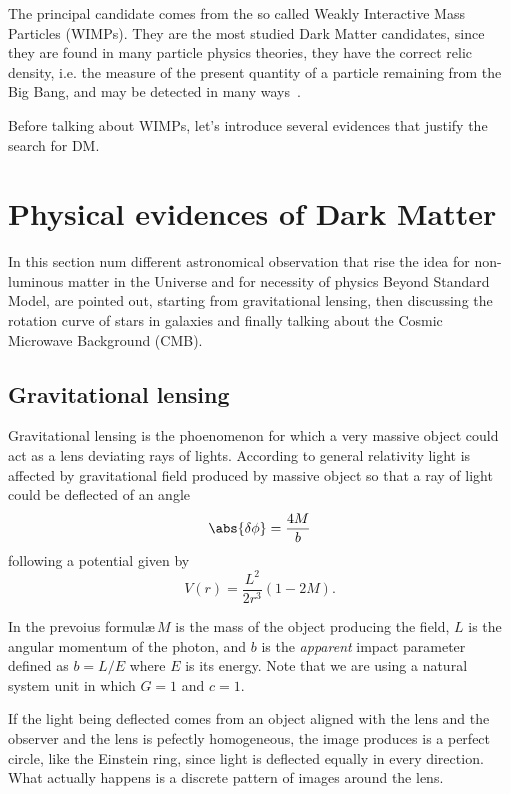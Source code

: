 The principal candidate comes from the so called Weakly Interactive Mass Particles (WIMPs). They are the most studied Dark Matter candidates, since they are found in many particle physics theories, they have the correct relic density, i.e. the measure of the present quantity of a particle remaining from the Big Bang, and may be detected in many ways~\cite{feng:DM}.

Before talking about WIMPs, let's introduce several evidences that justify the search for DM.

\section{Physical evidences of Dark Matter}
In this section num different astronomical observation that rise the idea for non-luminous matter in the Universe and for necessity of physics Beyond Standard Model, are pointed out, starting from gravitational lensing, then discussing the rotation curve of stars in galaxies and finally talking about the Cosmic Microwave Background (CMB).

\subsection{Gravitational lensing}
Gravitational lensing is the phoenomenon for which a very massive object could act as a lens deviating rays of lights. According to general relativity light is affected by gravitational field produced by massive object so that a ray of light could be deflected of an angle 
\begin{equation}
\abs{\delta\phi}=\frac{4M}{b}
\end{equation}
following a potential given by
\begin{equation}
V(r)=\frac{L^2}{2r^3}(1-2M).
\end{equation}

In the prevoius formul\ae $\,M$ is the mass of the object producing the field, $L$ is the angular momentum of the photon, and $b$ is the \emph{apparent} impact parameter defined as $b=L/E$ where $E$ is its energy. Note that we are using a natural system unit in which $G=1$ and $c=1$.

If the light being deflected comes from an object aligned with the lens and the observer and the lens is pefectly homogeneous, the image produces is a perfect circle, like the Einstein ring, since light is deflected equally in every direction. What actually happens is a discrete pattern of images around the lens.

